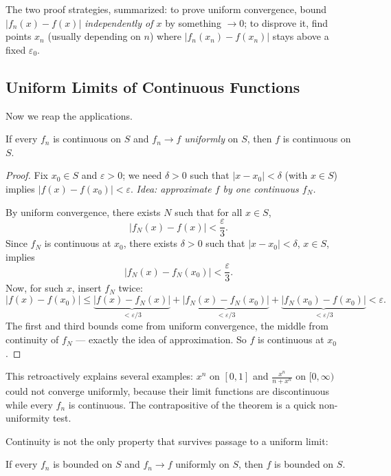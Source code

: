 \documentclass[11pt]{report}
\begin{document}
The two proof strategies, summarized: to prove uniform convergence, bound $|f_n(x) - f(x)|$ \emph{independently of $x$} by something $\to 0$; to disprove it, find points $x_n$ (usually depending on $n$) where $|f_n(x_n) - f(x_n)|$ stays above a fixed $\varepsilon_0$.

\subsection{Uniform Limits of Continuous Functions}

Now we reap the applications.

\begin{thmbox}
If every $f_n$ is continuous on $S$ and $f_n \to f$ \emph{uniformly} on $S$, then $f$ is continuous on $S$.
\end{thmbox}

\begin{proof}
Fix $x_0 \in S$ and $\varepsilon > 0$; we need $\delta > 0$ such that $|x - x_0| < \delta$ (with $x \in S$) implies $|f(x) - f(x_0)| < \varepsilon$. \emph{Idea: approximate $f$ by one continuous $f_N$.}

By uniform convergence, there exists $N$ such that for all $x \in S$,
\[
|f_N(x) - f(x)| < \frac\varepsilon3.
\]
Since $f_N$ is continuous at $x_0$, there exists $\delta > 0$ such that $|x - x_0| < \delta$, $x \in S$, implies
\[
|f_N(x) - f_N(x_0)| < \frac\varepsilon3.
\]
Now, for such $x$, insert $f_N$ twice:
\[
|f(x) - f(x_0)| \leq \underbrace{|f(x) - f_N(x)|}_{< \varepsilon/3} + \underbrace{|f_N(x) - f_N(x_0)|}_{< \varepsilon/3} + \underbrace{|f_N(x_0) - f(x_0)|}_{< \varepsilon/3} < \varepsilon.
\]
The first and third bounds come from uniform convergence, the middle from continuity of $f_N$ --- exactly the idea of approximation. So $f$ is continuous at $x_0$.
\end{proof}

\begin{rembox}
This retroactively explains several examples: $x^n$ on $[0,1]$ and $\tfrac{x^n}{n+x^n}$ on $[0,\infty)$ could not converge uniformly, because their limit functions are discontinuous while every $f_n$ is continuous. The contrapositive of the theorem is a quick non-uniformity test.
\end{rembox}

Continuity is not the only property that survives passage to a uniform limit:

\begin{propbox}
If every $f_n$ is bounded on $S$ and $f_n \to f$ uniformly on $S$, then $f$ is bounded on $S$.
\end{propbox}
\end{document}
